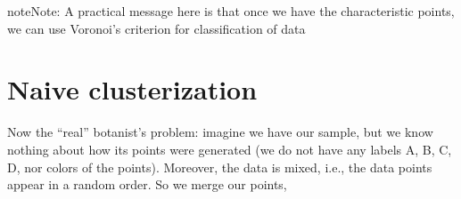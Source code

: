 \documentclass[letterpaper,10pt,english]{jupyterBook}
\begin{document}
\begin{sphinxVerbatim}[commandchars=\\\{\}]
\PYG{p}{[}\PYG{p}{]}\PYG{p}{[}\PYG{p}{]}  
\PYG{p}{[}\PYG{p}{]}\PYG{p}{[}\PYG{p}{]}  
\PYG{p}{[}\PYG{p}{]}\PYG{p}{[}\PYG{p}{]}  
\PYG{p}{[}\PYG{p}{]}\PYG{p}{[}\PYG{p}{]}  

\end{sphinxVerbatim}

\begin{sphinxadmonition}{note}{Note:}
\sphinxAtStartPar
A practical message here is that once we have the characteristic points, we can use Voronoi’s criterion for classification of data
\end{sphinxadmonition}


\section{Naive clusterization}
\label{\detokenize{docs/unsupervised:naive-clusterization}}
\sphinxAtStartPar
Now the “real” botanist’s problem:  imagine we have our sample, but we know nothing about how its points were generated (we do not have any labels A, B, C, D, nor colors of the points). Moreover, the data is mixed, i.e., the data points appear in a random order. So we merge our points,
\end{document}
